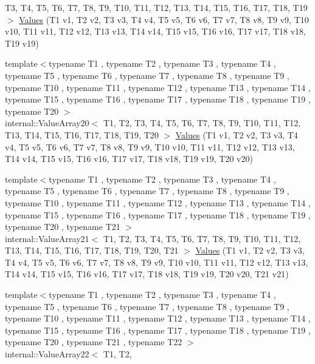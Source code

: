 \begin{DoxyCompactItemize}
\-T3, \-T4, \-T5, \-T6, \-T7, \-T8, \-T9, \*
\-T10, \-T11, \-T12, \-T13, \-T14, \-T15, \*
\-T16, \-T17, \-T18, \-T19 $>$ \hyperlink{namespacetesting_a673757dbfc048bbb48e459485b30b2bf}{\-Values} (\-T1 v1, \-T2 v2, \-T3 v3, \-T4 v4, \-T5 v5, \-T6 v6, \-T7 v7, \-T8 v8, \-T9 v9, \-T10 v10, \-T11 v11, \-T12 v12, \-T13 v13, \-T14 v14, \-T15 v15, \-T16 v16, \-T17 v17, \-T18 v18, \-T19 v19)
\item 
{\footnotesize template$<$typename T1 , typename T2 , typename T3 , typename T4 , typename T5 , typename T6 , typename T7 , typename T8 , typename T9 , typename T10 , typename T11 , typename T12 , typename T13 , typename T14 , typename T15 , typename T16 , typename T17 , typename T18 , typename T19 , typename T20 $>$ }\\internal\-::\-Value\-Array20$<$ \-T1, \-T2, \*
\-T3, \-T4, \-T5, \-T6, \-T7, \-T8, \-T9, \*
\-T10, \-T11, \-T12, \-T13, \-T14, \-T15, \*
\-T16, \-T17, \-T18, \-T19, \-T20 $>$ \hyperlink{namespacetesting_aedd2f90dfb3c42dce713ba0b89cde96c}{\-Values} (\-T1 v1, \-T2 v2, \-T3 v3, \-T4 v4, \-T5 v5, \-T6 v6, \-T7 v7, \-T8 v8, \-T9 v9, \-T10 v10, \-T11 v11, \-T12 v12, \-T13 v13, \-T14 v14, \-T15 v15, \-T16 v16, \-T17 v17, \-T18 v18, \-T19 v19, \-T20 v20)
\item 
{\footnotesize template$<$typename T1 , typename T2 , typename T3 , typename T4 , typename T5 , typename T6 , typename T7 , typename T8 , typename T9 , typename T10 , typename T11 , typename T12 , typename T13 , typename T14 , typename T15 , typename T16 , typename T17 , typename T18 , typename T19 , typename T20 , typename T21 $>$ }\\internal\-::\-Value\-Array21$<$ \-T1, \-T2, \*
\-T3, \-T4, \-T5, \-T6, \-T7, \-T8, \-T9, \*
\-T10, \-T11, \-T12, \-T13, \-T14, \-T15, \*
\-T16, \-T17, \-T18, \-T19, \-T20, \-T21 $>$ \hyperlink{namespacetesting_a6f3b9661b48f2c663dbe5fcfb0720f5f}{\-Values} (\-T1 v1, \-T2 v2, \-T3 v3, \-T4 v4, \-T5 v5, \-T6 v6, \-T7 v7, \-T8 v8, \-T9 v9, \-T10 v10, \-T11 v11, \-T12 v12, \-T13 v13, \-T14 v14, \-T15 v15, \-T16 v16, \-T17 v17, \-T18 v18, \-T19 v19, \-T20 v20, \-T21 v21)
\item 
{\footnotesize template$<$typename T1 , typename T2 , typename T3 , typename T4 , typename T5 , typename T6 , typename T7 , typename T8 , typename T9 , typename T10 , typename T11 , typename T12 , typename T13 , typename T14 , typename T15 , typename T16 , typename T17 , typename T18 , typename T19 , typename T20 , typename T21 , typename T22 $>$ }\\internal\-::\-Value\-Array22$<$ \-T1, \-T2, \*

\end{DoxyCompactItemize}
